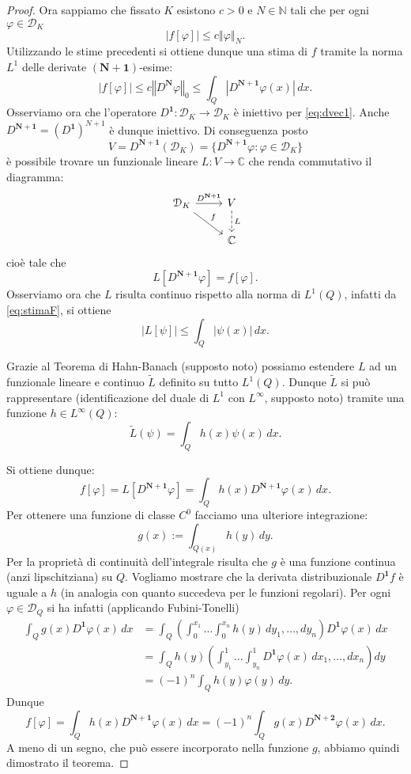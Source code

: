 \documentclass[italian,a4paper,oneside,headinclude]{scrbook}
\renewcommand{\phi}{\varphi}
\newcommand{\D}{\mathcal D}
\newcommand{\CC}{\mathbb C}
\newcommand{\NN}{\mathbb N}
\newcommand{\abs}[1]{{\left|#1\right|}}
\newcommand{\Abs}[1]{{\left\Vert #1\right\Vert}}
\renewcommand{\vec}[1]{\mathbf #1}
\newcommand{\defeq}{:=}
\begin{document}
\begin{proof}
  Ora sappiamo che fissato $K$ esistono $c>0$ e $N\in \NN$ tali che
  per ogni $\phi\in \D_K$
  \begin{equation*}
  \abs{f[\phi]} \le c \Abs{\phi}_N.
  \end{equation*}
  Utilizzando le stime precedenti si ottiene dunque una stima di $f$
  tramite la norma $L^1$ delle derivate $(\vec N + \vec 1)$-esime:
  \begin{equation}\label{eq:stimaF}
  \abs{f[\phi]} \le c \Abs{D^{\vec N}\phi}_0 \le \int_Q \abs{D^{\vec N
      + \vec 1} \phi(x)}\, dx.
  \end{equation}
  Osserviamo ora che l'operatore $D^{\vec 1}\colon \D_K \to \D_K$ è
  iniettivo per \eqref{eq:dvec1}.
  Anche $D^{\vec N+\vec 1} = (D^{\vec 1})^{N+1}$ è dunque
  iniettivo. Di conseguenza posto
  \[
  V = D^{\vec N+\vec 1}(\D_K) = \{D^{\vec N + \vec 1} \phi\colon
  \phi \in \D_K\}
  \]
  è possibile trovare un funzionale lineare
  $L\colon V\to \CC$ che renda commutativo il diagramma:
  \[
  \begin{tikzcd}
    \D_K \arrow[r, "D^{\vec N+ \vec 1}"] \arrow[rd, "f"] &
    V \arrow[d, dashed, "L"]\\
    & \CC
  \end{tikzcd}
  \]
  cioè tale che
  \[
  L[D^{\vec N+\vec 1}\phi] = f[\phi].
  \]
  Osserviamo ora che $L$ risulta continuo rispetto alla norma di
  $L^1(Q)$, infatti da \eqref{eq:stimaF}, si ottiene
  \[
  \abs{L[\psi]} \le \int_Q \abs{\psi(x)}\, dx.
  \]

  Grazie al Teorema di Hahn-Banach (supposto noto) possiamo estendere
  $L$ ad un funzionale lineare e continuo $\tilde L$ definito su tutto
  $L^1(Q)$. Dunque $\tilde L$ si può rappresentare (identificazione
  del duale di $L^1$ con $L^\infty$, supposto noto) tramite una
  funzione $h\in L^\infty(Q)$:
  \[
  \tilde L (\psi) = \int_Q h(x)\psi(x)\, dx.
  \]

  Si ottiene dunque:
  \[
  f[\phi] = L[D^{\vec N + \vec 1} \phi] = \int_Q h(x) D^{\vec N + \vec
    1}\phi(x)\, dx.
  \]
  Per ottenere una funzione di classe $C^0$ facciamo una ulteriore
  integrazione:
  \[
  g(x)\defeq \int_{Q(x)} h(y)\, dy.
  \]
  Per la proprietà di continuità dell'integrale risulta che $g$ è una
  funzione continua (anzi lipschitziana) su $Q$.
  Vogliamo mostrare che la derivata distribuzionale $D^{\vec 1}f$ è
  uguale a $h$ (in analogia con quanto succedeva per le funzioni
  regolari).
  Per ogni $\phi\in \D_Q$ si ha infatti (applicando Fubini-Tonelli)
  \begin{align*}
  \int_Q g(x) D^{\vec 1}\phi(x)\, dx
  & = \int_Q \left(\int_0^{x_1}\dots\int_0^{x_n} h(y)
  \, dy_1,\dots, dy_n\right) D^{\vec 1}\phi(x)\,dx \\
  & = \int_Q h(y)\left(\int_{y_1}^1\dots\int_{y_n}^1 D^{\vec 1}\phi(x)\,
  dx_1,\dots,dx_n\right) dy\\
  & = (-1)^n\int_Q h(y) \phi(y)\, dy.
  \end{align*}
  Dunque
  \[
  f[\phi] = \int_Q h(x) D^{\vec N+\vec 1} \phi(x)\, dx
   = (-1)^n \int_Q g(x) D^{\vec N + \vec 2} \phi(x)\, dx.
  \]
  A meno di un segno, che può essere incorporato nella funzione $g$,
  abbiamo quindi dimostrato il teorema.
\end{proof}
\end{document}
